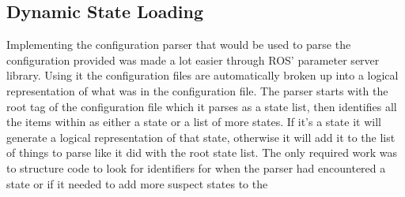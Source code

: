 \subsection{Dynamic State Loading}
Implementing the configuration parser that would be used to parse the
configuration provided was made a lot easier through ROS' parameter server
library.
Using it the configuration files are automatically broken up into a logical
representation of what was in the configuration file.
The parser starts with the root tag of the configuration file which it parses as a
state list, then identifies all the items within as either a state or a list of
more states.
If it's a state it will generate a logical representation of that state,
otherwise it will add it to the list of things to parse like it did with the
root state list.
The only required work was to structure code to look for identifiers for when
the parser had encountered a state or if it needed to add more suspect states to
the 